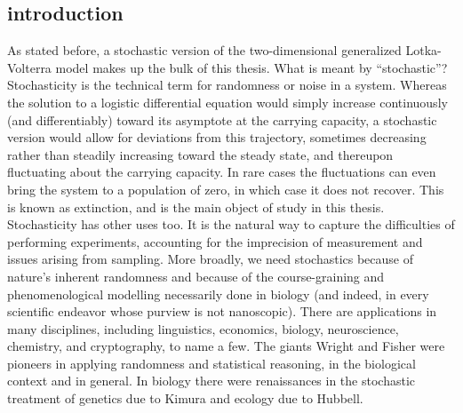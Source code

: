 \subsection{introduction}
As stated before, a stochastic version of the two-dimensional generalized Lotka-Volterra model makes up the bulk of this thesis. 
What is meant by ``stochastic''? 
Stochasticity is the technical term for randomness or noise in a system. 
Whereas the solution to a logistic differential equation would simply increase continuously (and differentiably) toward its asymptote at the carrying capacity, a stochastic version would allow for deviations from this trajectory, sometimes decreasing rather than steadily increasing toward the steady state, and thereupon fluctuating about the carrying capacity. 
In rare cases the fluctuations can even bring the system to a population of zero, in which case it does not recover. 
This is known as extinction, and is the main object of study in this thesis. 
Stochasticity has other uses too. 
It is the natural way to capture the difficulties of performing experiments, accounting for the imprecision of measurement and issues arising from sampling. 
More broadly, we need stochastics because of nature's inherent randomness and because of the course-graining and phenomenological modelling necessarily done in biology (and indeed, in every scientific endeavor whose purview is not nanoscopic). %
There are applications in many disciplines, including linguistics, economics, biology, neuroscience, chemistry, and cryptography, to name a few. 
The giants Wright and Fisher were pioneers in applying randomness and statistical reasoning, in the biological context and in general. 
In biology there were renaissances in the stochastic treatment of genetics due to Kimura and ecology due to Hubbell. 

